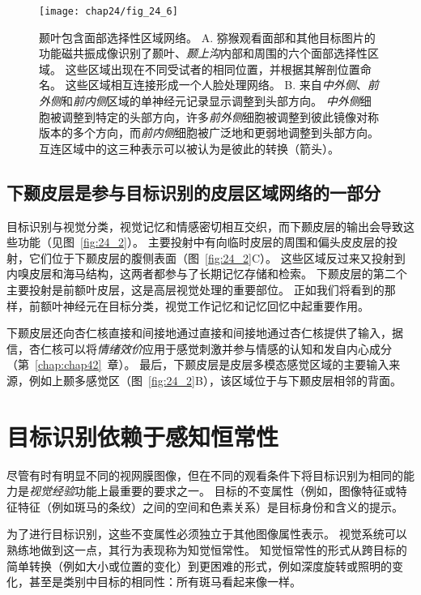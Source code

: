 \begin{figure}[htbp]
	\centering
	\texttt{[image: chap24/fig\_24\_6]}
	\caption{颞叶包含面部选择性区域网络。
		A. 猕猴观看面部和其他目标图片的功能磁共振成像识别了颞叶、\textit{颞上沟}内部和周围的六个面部选择性区域。
		这些区域出现在不同受试者的相同位置，并根据其解剖位置命名。
		这些区域相互连接形成一个人脸处理网络。
		B. 来自\textit{中外侧}、\textit{前外侧}和\textit{前内侧}区域的单神经元记录显示调整到头部方向。
		\textit{中外侧}细胞被调整到特定的头部方向，许多\textit{前外侧}细胞被调整到彼此镜像对称版本的多个方向，而\textit{前内侧}细胞被广泛地和更弱地调整到头部方向。
		互连区域中的这三种表示可以被认为是彼此的转换（箭头）。}
	\label{fig:24_6}
\end{figure}



\subsection{下颞皮层是参与目标识别的皮层区域网络的一部分}

目标识别与视觉分类，视觉记忆和情感密切相互交织，而下颞皮层的输出会导致这些功能（见图~\ref{fig:24_2}）。
主要投射中有向临时皮层的周围和偏头皮皮层的投射，它们位于下颞皮层的腹侧表面（图~\ref{fig:24_2}C）。
这些区域反过来又投射到内嗅皮层和海马结构，这两者都参与了长期记忆存储和检索。
下颞皮层的第二个主要投射是前额叶皮层，这是高层视觉处理的重要部位。
正如我们将看到的那样，前额叶神经元在目标分类，视觉工作记忆和记忆回忆中起重要作用。


下颞皮层还向杏仁核直接和间接地通过直接和间接地通过杏仁核提供了输入，据信，杏仁核可以将\textit{情绪效价}应用于感觉刺激并参与情感的认知和发自内心成分（第~\ref{chap:chap42}~章）。
最后，下颞皮层是皮层多模态感觉区域的主要输入来源，例如上颞多感觉区（图~\ref{fig:24_2}B），该区域位于与下颞皮层相邻的背面。



\section{目标识别依赖于感知恒常性}

尽管有时有明显不同的视网膜图像，但在不同的观看条件下将目标识别为相同的能力是\textit{视觉经验}功能上最重要的要求之一。
目标的不变属性（例如，图像特征或特征特征（例如斑马的条纹）之间的空间和色素关系）是目标身份和含义的提示。


为了进行目标识别，这些不变属性必须独立于其他图像属性表示。
视觉系统可以熟练地做到这一点，其行为表现称为知觉恒常性。
知觉恒常性的形式从跨目标的简单转换（例如大小或位置的变化）到更困难的形式，例如深度旋转或照明的变化，甚至是类别中目标的相同性：所有斑马看起来像一样。


